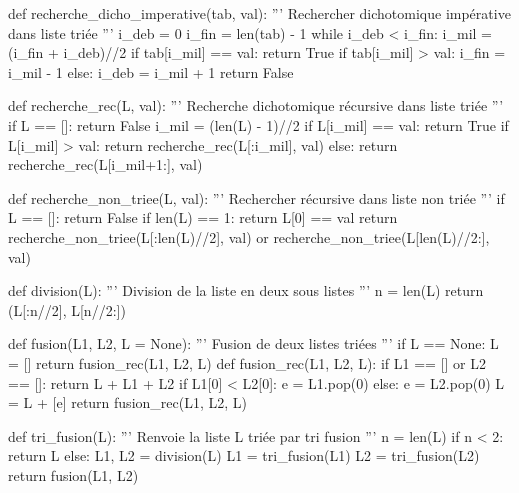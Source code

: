 \newpage

\begin{CodePythontexAlt}[Largeur=1\linewidth,Centre,Lignes=true,PremLigne=1]{}

def recherche_dicho_imperative(tab, val):
    ''' Rechercher dichotomique impérative dans liste triée '''
    i_deb = 0
    i_fin = len(tab) - 1
    while i_deb < i_fin:
        i_mil = (i_fin + i_deb)//2
        if tab[i_mil] == val:
            return True
        if tab[i_mil] > val:
            i_fin = i_mil - 1
        else:
            i_deb = i_mil + 1
    return False

def recherche_rec(L, val):
    ''' Recherche dichotomique récursive dans liste triée '''
    if L == []:
        return False
    i_mil = (len(L) - 1)//2
    if L[i_mil] == val:
        return True
    if L[i_mil] > val:
        return recherche_rec(L[:i_mil], val)
    else:
        return recherche_rec(L[i_mil+1:], val)

def recherche_non_triee(L, val):
    ''' Rechercher récursive dans liste non triée '''
    if L == []:
        return False
    if len(L) == 1:
        return L[0] == val
    return recherche_non_triee(L[:len(L)//2], val) or recherche_non_triee(L[len(L)//2:], val)

def division(L):
    ''' Division de la liste en deux sous listes '''
    n = len(L)
    return (L[:n//2], L[n//2:])

def fusion(L1, L2, L = None):
    ''' Fusion de deux listes triées '''
    if L == None:
        L = []
    return fusion_rec(L1, L2, L)
def fusion_rec(L1, L2, L):
    if L1 == [] or L2 == []:
        return L + L1 + L2
    if L1[0] < L2[0]:
        e = L1.pop(0)
    else:
        e = L2.pop(0)
    L = L + [e]
    return fusion_rec(L1, L2, L)

def tri_fusion(L):
    ''' Renvoie la liste L triée par tri fusion '''
    n = len(L)
    if n < 2:
        return L
    else:
        L1, L2 = division(L)
        L1 = tri_fusion(L1)
        L2 = tri_fusion(L2)
        return fusion(L1, L2)
\end{CodePythontexAlt}
    \resetalltcb{}
